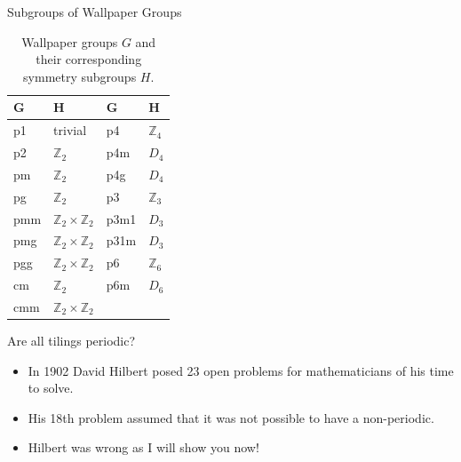 \documentclass{beamer}
\begin{document}
\begin{frame}{Subgroups of Wallpaper Groups}
  \begin{table}
    \centering
    \begin{tabular}{@{} ll @{\qquad} ll @{}}
      \toprule
      \textbf{G} & \textbf{H} & \textbf{G} & \textbf{H} \\
      \midrule
      p1   & trivial                          & p4    & $\mathbb{Z}_4$              \\
      p2   & $\mathbb{Z}_2$                   & p4m   & $D_4$                       \\
      pm   & $\mathbb{Z}_2$                   & p4g   & $D_4$                       \\
      pg   & $\mathbb{Z}_2$                   & p3    & $\mathbb{Z}_3$              \\
      pmm  & $\mathbb{Z}_2\times\mathbb{Z}_2$ & p3m1  & $D_3$                       \\
      pmg  & $\mathbb{Z}_2\times\mathbb{Z}_2$ & p31m  & $D_3$                       \\
      pgg  & $\mathbb{Z}_2\times\mathbb{Z}_2$ & p6    & $\mathbb{Z}_6$              \\
      cm   & $\mathbb{Z}_2$                   & p6m   & $D_6$                       \\
      cmm  & $\mathbb{Z}_2\times\mathbb{Z}_2$ &       &                             \\
      \bottomrule
    \end{tabular}
    \caption{Wallpaper groups \(G\) and their corresponding symmetry subgroups \(H\).} \cite{sasse_2020}
  \end{table}
\end{frame}


\begin{frame}{Are all tilings periodic?}
    \begin{itemize}
        \item In 1902 David Hilbert posed 23 open problems for mathematicians of his time to solve. \item His 18th problem assumed that it was not possible to have a non-periodic. \cite{hilbert1902mathematical}
        \item Hilbert was wrong as I will show you now!
        \end{itemize}
\end{frame}
\end{document}

